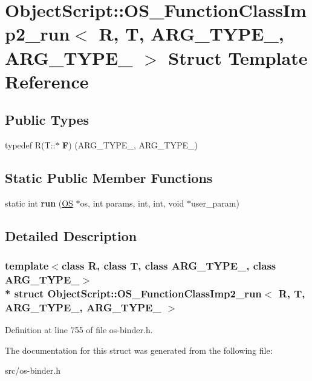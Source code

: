 \hypertarget{struct_object_script_1_1_o_s___function_class_imp2__run}{}\section{Object\+Script\+:\+:O\+S\+\_\+\+Function\+Class\+Imp2\+\_\+run$<$ R, T, A\+R\+G\+\_\+\+T\+Y\+P\+E\+\_, A\+R\+G\+\_\+\+T\+Y\+P\+E\+\_ $>$ Struct Template Reference}
\label{struct_object_script_1_1_o_s___function_class_imp2__run}
\subsection*{Public Types}
\begin{DoxyCompactItemize}
\item 
typedef R(T\+::$\ast$ {\bfseries F}) (A\+R\+G\+\_\+\+T\+Y\+P\+E\+\_, A\+R\+G\+\_\+\+T\+Y\+P\+E\+\_)\hypertarget{struct_object_script_1_1_o_s___function_class_imp2__run_a0e93c83ea5c57ee5c71cbaa29fb52cb0}{}\label{struct_object_script_1_1_o_s___function_class_imp2__run_a0e93c83ea5c57ee5c71cbaa29fb52cb0}

\end{DoxyCompactItemize}
\subsection*{Static Public Member Functions}
\begin{DoxyCompactItemize}
\item 
static int {\bfseries run} (\hyperlink{class_object_script_1_1_o_s}{OS} $\ast$os, int params, int, int, void $\ast$user\+\_\+param)\hypertarget{struct_object_script_1_1_o_s___function_class_imp2__run_a488a2ed1aa57d552aa32fd10864897aa}{}\label{struct_object_script_1_1_o_s___function_class_imp2__run_a488a2ed1aa57d552aa32fd10864897aa}

\end{DoxyCompactItemize}


\subsection{Detailed Description}
\subsubsection*{template$<$class R, class T, class A\+R\+G\+\_\+\+T\+Y\+P\+E\+\_, class A\+R\+G\+\_\+\+T\+Y\+P\+E\+\_$>$\\*
struct Object\+Script\+::\+O\+S\+\_\+\+Function\+Class\+Imp2\+\_\+run$<$ R, T, A\+R\+G\+\_\+\+T\+Y\+P\+E\+\_, A\+R\+G\+\_\+\+T\+Y\+P\+E\+\_ $>$}



Definition at line 755 of file os-\/binder.\+h.



The documentation for this struct was generated from the following file\+:\begin{DoxyCompactItemize}
\item 
src/os-\/binder.\+h\end{DoxyCompactItemize}
